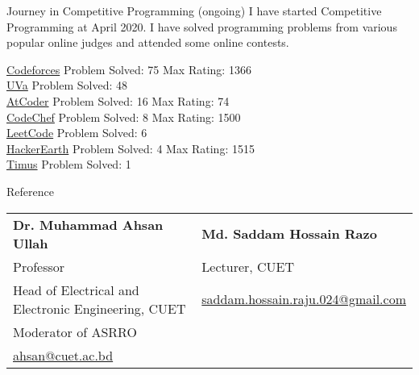\documentclass{article}
\newlength{\tabin}
\newlength{\secsep}
\newcommand{\lineunder}{\vspace*{-8pt} \\ \hspace*{-6pt} \hrulefill \\ \vspace*{-15pt}}
\newenvironment{tabbedsection}[1]{
  \begin{list}{}{
      \setlength{\itemsep}{0pt}
      \setlength{\labelsep}{0pt}
      \setlength{\labelwidth}{0pt}
      \setlength{\leftmargin}{\tabin}
      \setlength{\rightmargin}{\tabin}
      \setlength{\listparindent}{0pt}
      \setlength{\parsep}{0pt}
      \setlength{\parskip}{0pt}
      \setlength{\partopsep}{0pt}
      \setlength{\topsep}{#1}
    }
  \item[]
}{\end{list}}
\newenvironment{resume_section}[1]{
  \filbreak
  \vspace{2\secsep}
  \textsc{\large#1}
  \lineunder
  \begin{tabbedsection}{\secsep}
}{\end{tabbedsection}}
\newenvironment{subitems}{
  \renewcommand{\labelitemi}{-}
  \begin{itemize}
      \setlength{\labelsep}{1em}
}{\end{itemize}}
\begin{document}
  \begin{resume_section}{Journey in Competitive Programming (ongoing)}
    I have started Competitive Programming at April 2020. I have solved programming problems from various popular online judges and attended some online contests.
    \begin{subitems}
        \href{https://codeforces.com/profile/ehsan3p}{Codeforces} \hspace{2cm} Problem Solved: 75 \hspace{2cm}  Max Rating: 1366 \\
        \href{https://uhunt.onlinejudge.org/id/839904}{UVa} \hspace{3cm} Problem Solved: 48 \\
        \href{https://atcoder.jp/users/ehsan3p}{AtCoder} \hspace{67px} Problem Solved: 16 \hspace{2cm}  Max Rating: 74 \\
        \href{https://www.codechef.com/users/pappu3p}{CodeChef} \hspace{62px} Problem Solved: 8 \hspace{62px}  Max Rating: 1500 \\
        \href{https://leetcode.com/Ehsanul-Karim-Pappu/}{LeetCode} \hspace{63px} Problem Solved: 6 \\
        \href{https://www.hackerearth.com/@ehsan.pappu.99}{HackerEarth} \hspace{49px} Problem Solved: 4  \hspace{62px}  Max Rating: 1515 \\
        \href{https://acm.timus.ru/author.aspx?id=295993}{Timus} \hspace{77px} Problem Solved: 1
    \end{subitems}
  \end{resume_section}






\begin{resume_section}{Reference}
  \vspace{5px}
  \begin{tabularx}{\textwidth}{XX}
    \textbf{Dr. Muhammad Ahsan Ullah} & \textbf{Md. Saddam Hossain Razo} \\ 
    Professor & Lecturer, CUET \\
    Head of Electrical and Electronic Engineering, CUET & \href{mailto:saddam.hossain.raju.024@gmail.com}{saddam.hossain.raju.024@gmail.com} \\
    Moderator of ASRRO &  \\
    \href{mailto:ahsan@cuet.ac.bd}{ahsan@cuet.ac.bd} &
  
  \end{tabularx}
\end{resume_section}
\end{document}
